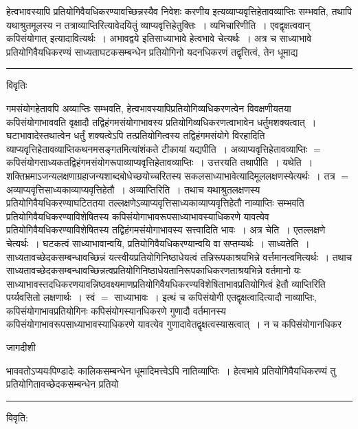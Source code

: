 \documentclass[10pt, openany]{book}
\begin{document}
{{\la हेत्वभावस्यापि प्रतियोगिवैयधिकरण्यावच्छिन्नस्यैव निवेशः करणीय इत्यव्याप्यवृत्तिहेतावव्याप्तिः सम्भवति, तथापि यथाश्रुतमूलस्य न तत्राव्याप्तिरित्यावेदयितुं व्याप्यवृत्तिहेतुक्तिः~। व्यभिचारिणीति~। {\qt एवद्वृक्षत्ववान् कपिसंयोगात् इत्यादावित्यर्थः~}। अभावद्वये इति\textendash साध्याभावे हेत्वभावे चेत्यर्थः~। अत्र च साध्याभावे प्रतियोगिवैयधिकरण्यं साध्यताघटकसम्बन्धेन प्रतियोगिनो यदनधिकरणं तद्वृत्तित्वं, तेन धूमाद्य}\\
\hrule
\begin{center}     विवृतिः \end{center}
गमसंयोगहेतावपि अव्याप्तिः सम्भवति, हेत्वभावस्यापिप्रतियोगिव्यधिकरणत्वेन विवक्षणीयतया कपिसंयोगाभाववति वृक्षादौ तद्विहंगमसंयोगाभावस्य प्रतियोगिव्यधिकरणत्वाभावेन धर्तुमशक्यत्वात्~। घटाभावादेस्तथात्वेन धर्तुं शक्यत्वेऽपि तत्प्रतियोगित्वस्य तद्विहंगमसंयोगे विरहादिति
व्याप्यवृत्तिहेतावव्याप्तिकथनमसङ्गतमित्यांशंकते टीकायां {\la यद्यपीति~।} अव्याप्यवृत्तिहेतावव्याप्तिः $=$ कपिसंयोगसाध्यकतद्विहंगमसंयोगरूपाव्याप्यवृत्तिहेतावव्याप्तिः~। {\qt उत्तरयति} तथापीति~। यथेति~। शक्तिभ्रमाऽजन्यलक्षणाग्रहाजन्यशाब्दबोधेच्छयोच्चरितस्य सकलसाध्याभावेत्यादिमूललक्षणस्येत्यर्थः~। तत्र $=$ अव्याप्यवृत्तिसाध्यकाव्याप्यवृत्तिहेतौ~। {\la अव्याप्तिरिति~।} तथाच यथाश्रुतलक्षणस्य प्रतियोगिवैयधिकरण्याघटिततया तल्लक्षणेऽव्याप्यवृत्तिसाध्यकाव्याप्यवृत्तिहेतौ नाव्याप्तिः सम्भवति प्रतियोगिवैयधिकरण्याविशेषितस्य कपिसंयोगाभावरूपसाध्याभावस्याधिकरणे यावत्येव प्रतियोगिवैयधिकरण्याविशेषितस्य तद्विहंगमसंयोगाभावस्य सत्त्वादिति भावः~। अत्र चेति~। एतल्लक्षणे चेत्यर्थः~। घटकत्वं साध्याभावान्वयि, प्रतियोगिवैयधिकरण्यान्वयि वा सप्तम्यर्थः~। {\la साध्यतेति~।} साध्यतावच्छेदकसम्बन्धावच्छिन्नं यत्स्वीयप्रतियोगिनिष्ठाधेयत्वं तन्निरूपकाश्रयभिन्ने वर्त्तमानत्वमित्यर्थः~। तथाच साध्यतावच्छेदकसम्बन्धावच्छिन्नत्वप्रतियोगिनिष्ठाधेयतानिरूपकाधिकरणताश्रयभिन्ने वर्तमानो यः साध्याभावस्तदधिकरणयावन्निष्ठवक्ष्यमाणप्रतियोगिवैयधिकरण्यविशेषिताभावप्रतियोगित्वं हेतौ व्याप्तिरिति पर्य्यवसितो लक्षणार्थः~। स्वं $=$ साध्याभावः~। इत्थं च कपिसंयोगी {\qt एतद्वृक्षत्वादित्यादौ नाव्याप्तिः,} कपिसंयोगाभावप्रतियोगिनः कपिसंयोगस्यानधिकरणे गुणादौ वर्तमानस्य कपिसंयोगाभावरूपसाध्याभावस्याधिकरणे यावत्येव गुणादावेतद्वृक्षत्वस्यासत्वात्~। न च कपिसंयोगानधिकर
\newpage
\begin{center} जागदीशी \end{center}
{\la भाववतोऽप्ययःपिण्डादेः कालिकसम्बन्धेन धूमादिमत्त्वेऽपि नातिव्याप्तिः~। हेत्वभावे प्रतियोगिवैयधिकरण्यं तु प्रतियोगितावच्छेदकसम्बन्धेन प्रतियो}\\
\hrule
\begin{center}
विवृति:    
\end{center}
}
\end{document}
